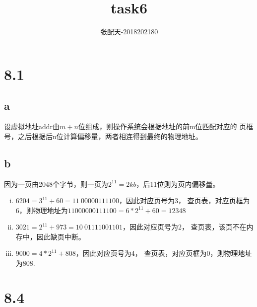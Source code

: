 \documentclass[UTF8]{ctexart}
\title{task6}
\author{张配天-2018202180}
\begin{document}
    \maketitle
    \section*{8.1}
    \subsection*{a}
    设虚拟地址addr由$m+n$位组成，则操作系统会根据地址的前m位匹配对应的
    页框号，之后根据后n位计算偏移量，两者相连得到最终的物理地址。
    \subsection*{b}
    因为一页由2048个字节，则一页为$2^{11}=2kb$，后11位则为页内偏移量。
    \begin{enumerate}[i.]
        \item $6204 = 3^{11} + 60 = 11\ 00000111100$，因此对应页号为3，
        查页表，对应页框为6，则物理地址为$11000000111100 = 6*2^{11} + 60 = 12348$
        \item $3021 = 2^{11} + 973 = 10\ 01111001101$，因此对应页号为2，
        查页表，该页不在内存中，因此缺页中断。
        \item $9000 = 4*2^{11} + 808$，因此对应页号为4，
        查页表，对应页框为0，则物理地址为808.
    \end{enumerate}
    \clearpage
    \section*{8.4}
\end{document}
